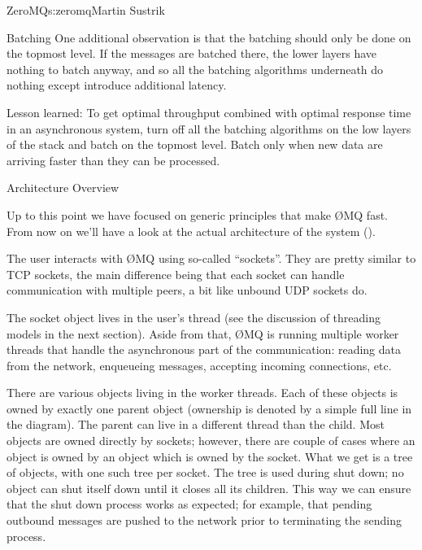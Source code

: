 \begin{aosachapter}{ZeroMQ}{s:zeromq}{Martin Sustrik}
\begin{aosasect1}{Batching}
One additional observation is that the batching should only be done on
the topmost level. If the messages are batched there, the lower layers
have nothing to batch anyway, and so all the batching algorithms
underneath do nothing except introduce additional latency.

Lesson learned: To get optimal throughput combined with optimal
response time in an asynchronous system, turn off all the batching
algorithms on the low layers of the stack and batch on the topmost
level. Batch only when new data are arriving faster than they can be
processed.

\end{aosasect1}

\begin{aosasect1}{Architecture Overview}

Up to this point we have focused on generic principles that make {\O}MQ
fast. From now on we'll have a look at the actual architecture of the
system ().


The user interacts with {\O}MQ using so-called ``sockets''. They are pretty
similar to TCP sockets, the main difference being that each socket can
handle communication with multiple peers, a bit like unbound UDP
sockets do.

The socket object lives in the user's thread (see the discussion of
threading models in the next section). Aside from that, {\O}MQ is running
multiple worker threads that handle the asynchronous part of the
communication: reading data from the network, enqueueing messages,
accepting incoming connections, etc.

There are various objects living in the worker threads. Each of these
objects is owned by exactly one parent object (ownership is denoted by 
a simple full line in the
diagram). The parent can live in a
different thread than the child. Most objects are owned directly by
sockets; however, there are couple of cases where an object is owned
by an object which is owned by the socket. What we get is a tree of
objects, with one such tree per socket. The tree is used during 
shut down; no object can shut itself down until it closes all its
children. This way we can ensure that the shut down process works as
expected; for example, that pending outbound messages are pushed to
the network prior to terminating the sending process.


\end{aosasect1}
\end{aosachapter}
